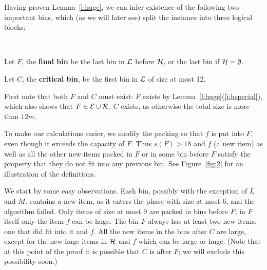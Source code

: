 Having proven Lemma~\ref{l:huge}, we can infer existence of the following
two important bins, which (as we will later see) split the instance into three
logical blocks:

\begin{dfn} ~ 

\begin{compactitem} \label{d:fc}
\item Let $F$, the \textbf{final bin} be the last bin in ${\mathcal L}$ before
${\mathcal H}$, or the last bin if ${\mathcal H}=\emptyset$.
\item Let $C$, the \textbf{critical bin}, be the
first bin in ${\mathcal L}$ of size at most 12. 
\end{compactitem}
\end{dfn}

First note that both $F$ and $C$ must exist: $F$ exists by
Lemma~\ref{l:huge}(\ref{i:hspecial}), which also shows that
$F\in{\mathcal E}\cup{\mathcal R}$. $C$ exists, as otherwise the total size is more
than $12m$.

To make our calculations easier, we modify the packing so that $f$ is put
into $F$, even though it exceeds the capacity of $F$.
Thus $s(F)>18$ and $f$ (a new item) as well as all the other new items packed
in $F$ or in some bin before $F$ satisfy the property that they do not
fit into any previous bin.  See Figure~\ref{fig:2} for an illustration
of the definitions.

We start by some easy observations. Each bin, possibly with the
exception of $L$ and $M$, contains a new item, as it enters the phase
with size at most 6, and the algorithm failed. Only items of size at
most $9$ are packed in bins before $F$; in $F$ itself only the item
$f$ can be huge.  The bin $F$ always has at least two new items, one that did
fit into it and $f$. All the new items in the bins after $C$ are
large, except for the new huge items in ${\mathcal H}$ and $f$ which can be
large or huge. (Note that at this point of the proof it is possible
that $C$ is after $F$; we will exclude this possibility soon.)

